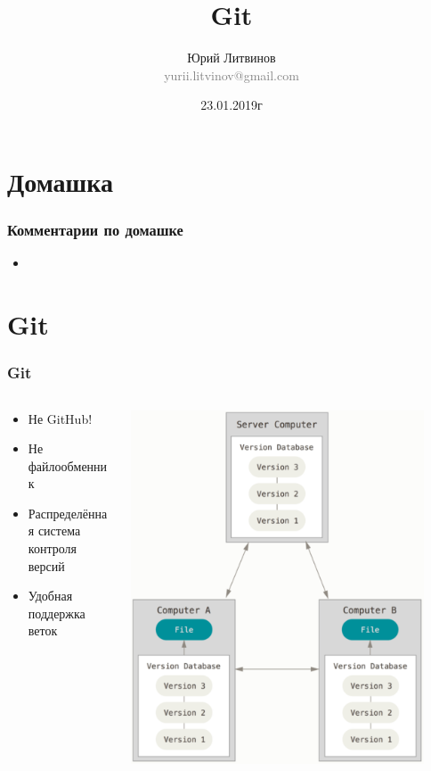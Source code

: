 \documentclass[xetex,mathserif,serif]{beamer}
\title{Git}
\author[Юрий Литвинов]{Юрий Литвинов\\\small{\textcolor{gray}{yurii.litvinov@gmail.com}}}
\date{23.01.2019г}
\begin{document}
	\frame{\titlepage}

	\section{Домашка}

	\begin{frame}
		\frametitle{Комментарии по домашке}
		\begin{itemize}
			\item 
		\end{itemize}
	\end{frame}

	\section{Git}

	\begin{frame}
		\frametitle{Git}
		\begin{columns}
			\begin{column}{0.5\textwidth}
				\begin{itemize}
					\item Не GitHub!
					\item Не файлообменник
					\item Распределённая система контроля версий
					\item Удобная поддержка веток
				\end{itemize}
			\end{column}
			\begin{column}{0.5\textwidth}
				\includegraphics[width=0.9\textwidth]{distributedVcs.png}
			\end{column}
		\end{columns}
	\end{frame}
\end{document}
